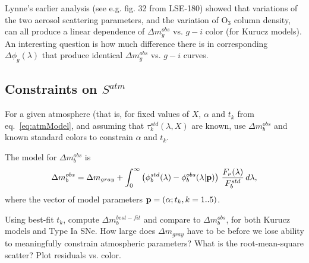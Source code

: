 \documentclass[12pt,preprint]{aastex}
\begin{document}
Lynne's earlier analysis (see e.g. fig. 32 from LSE-180) showed that variations of the 
two aerosol scattering parameters, and the variation of O$_3$ column density, can all 
produce a linear dependence of $\Delta m_g^{obs}$ vs. $g-i$ color (for Kurucz models). 
An interesting question is how much difference there is in corresponding $\Delta \phi_g(\lambda)$
that produce identical $\Delta m_g^{obs}$ vs. $g-i$ curves. 

\subsection{Constraints on $S^{atm}$} 

For a given atmosphere (that is, for fixed values of $X$, $\alpha$ and $t_k$ from eq.~\ref{eq:atmModel}, 
and assuming that $\tau_k^{std}(\lambda, X)$ are known, use $\Delta m_b^{obs}$ and known standard 
colors to constrain $\alpha$ and $t_k$.  

The model for $\Delta m_b^{obs}$ is 
\begin{equation}
  \Delta m_b^{obs}  = \Delta m_{gray} + \int_0^\infty { \left( \phi_b^{std}(\lambda) - \phi_b^{obs}(\lambda|{\bf p}) \right) \,  {F_\nu(\lambda) \over F_b^{std}} \, d\lambda},
\end{equation}
where the vector of model parameters ${\bf p} = (\alpha; t_k, k=1..5)$. 

Using best-fit $t_k$, compute $\Delta m_b^{best-fit}$ and compare to 
$\Delta m_b^{obs}$, for both Kurucz models and Type Ia SNe. How large does $\Delta m_{gray}$
have to be before we lose ability to meaningfully constrain atmospheric parameters? 
What is the root-mean-square scatter? Plot residuals vs. color. 
\end{document}
